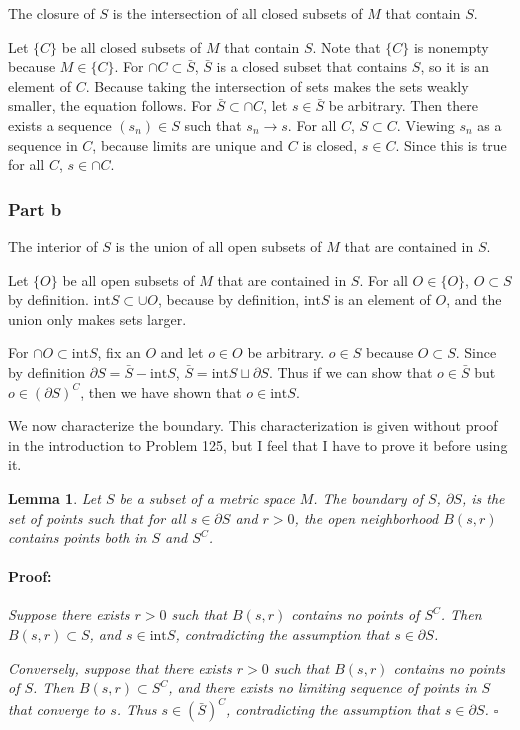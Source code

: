 \documentclass{article}
\newenvironment{proof}{\paragraph{Proof:}}{\hfill$\square$}
\newtheorem{lemma}[theorem]{Lemma}
\newcommand{\inter}{\text{int}}
\begin{document}
The closure of $S$ is the intersection of all closed subsets of $M$ that contain $S$.

Let $\{C\}$ be all closed subsets of $M$ that contain $S$. Note that $\{C\}$ is nonempty because $M \in \{C\}$. For $\cap C \subset \bar{S}$, $\bar{S}$ is a closed subset that contains $S$, so it is an element of $C$. Because taking the intersection of sets makes the sets weakly smaller, the equation follows. For $\bar{S} \subset \cap C$, let $s \in \bar{S}$ be arbitrary. Then there exists a sequence $(s_n) \in S$ such that $s_n \rightarrow s$. For all $C$, $S \subset C$. Viewing $s_n$ as a sequence in $C$, because limits are unique and $C$ is closed, $s \in C$. Since this is true for all $C$, $s \in \cap C$.

\subsubsection*{Part b}

The interior of $S$ is the union of all open subsets of $M$ that are contained in $S$.

Let $\{O\}$ be all open subsets of $M$ that are contained in $S$. For all $O \in \{O\}$, $O \subset S$ by definition. $\inter S \subset \cup O$, because by definition, $\inter S$ is an element of $O$, and the union only makes sets larger.

For $\cap O \subset \inter S$, fix an $O$ and let $o \in O$ be arbitrary. $o \in S$ because $O \subset S$. Since by definition $\partial S = \bar{S} - \inter S$, $\bar{S} = \inter S \sqcup \partial S$. Thus if we can show that $o \in \bar{S}$ but $o \in (\partial S)^C$, then we have shown that $o \in \inter S$.

We now characterize the boundary. This characterization is given without proof in the introduction to Problem 125, but I feel that I have to prove it before using it.

\begin{lemma}
\label{LemmaBoundaryContainsSandSC}
Let $S$ be a subset of a metric space $M$. The boundary of $S$, $\partial S$, is the set of points such that for all $s \in \partial S$ and $r > 0$, the open neighborhood $B(s, r)$ contains points both in $S$ and $S^C$.
\begin{proof}
Suppose there exists $r > 0$ such that $B(s, r)$ contains no points of $S^C$. Then $B(s, r) \subset S$, and $s \in \inter S$, contradicting the assumption that $s \in \partial S$.

Conversely, suppose that there exists $r > 0$ such that $B(s, r)$ contains no points of $S$. Then $B(s, r) \subset S^C$, and there exists no limiting sequence of points in $S$ that converge to $s$. Thus $s \in (\bar{S})^C$, contradicting the assumption that $s \in \partial S$.
\end{proof}
\end{lemma}
\end{document}
